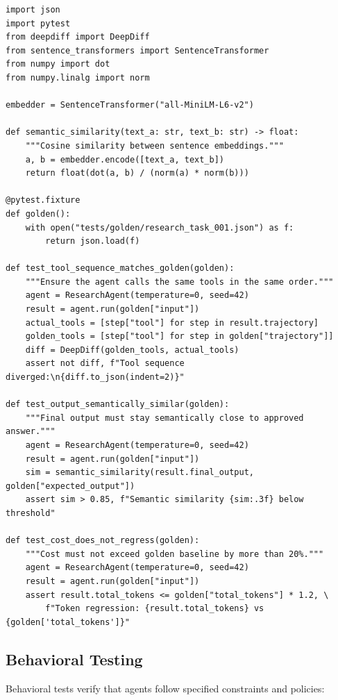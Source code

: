 \begin{lstlisting}[style=pythonstyle, caption={Golden trajectory regression testing}]
import json
import pytest
from deepdiff import DeepDiff
from sentence_transformers import SentenceTransformer
from numpy import dot
from numpy.linalg import norm

embedder = SentenceTransformer("all-MiniLM-L6-v2")

def semantic_similarity(text_a: str, text_b: str) -> float:
    """Cosine similarity between sentence embeddings."""
    a, b = embedder.encode([text_a, text_b])
    return float(dot(a, b) / (norm(a) * norm(b)))

@pytest.fixture
def golden():
    with open("tests/golden/research_task_001.json") as f:
        return json.load(f)

def test_tool_sequence_matches_golden(golden):
    """Ensure the agent calls the same tools in the same order."""
    agent = ResearchAgent(temperature=0, seed=42)
    result = agent.run(golden["input"])
    actual_tools = [step["tool"] for step in result.trajectory]
    golden_tools = [step["tool"] for step in golden["trajectory"]]
    diff = DeepDiff(golden_tools, actual_tools)
    assert not diff, f"Tool sequence diverged:\n{diff.to_json(indent=2)}"

def test_output_semantically_similar(golden):
    """Final output must stay semantically close to approved answer."""
    agent = ResearchAgent(temperature=0, seed=42)
    result = agent.run(golden["input"])
    sim = semantic_similarity(result.final_output, golden["expected_output"])
    assert sim > 0.85, f"Semantic similarity {sim:.3f} below threshold"

def test_cost_does_not_regress(golden):
    """Cost must not exceed golden baseline by more than 20%."""
    agent = ResearchAgent(temperature=0, seed=42)
    result = agent.run(golden["input"])
    assert result.total_tokens <= golden["total_tokens"] * 1.2, \
        f"Token regression: {result.total_tokens} vs {golden['total_tokens']}"
\end{lstlisting}

\subsection{Behavioral Testing}
\label{behavioral-testing}

Behavioral tests verify that agents follow specified constraints and policies:

